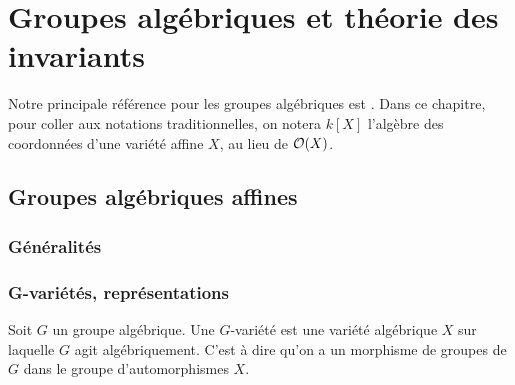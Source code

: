 \chapter{Groupes algébriques et théorie des invariants}

Notre principale référence pour les groupes algébriques est \cite{LAGSpringer}. Dans ce chapitre, pour coller aux notations traditionnelles, on notera $k[X]$ l'algèbre des coordonnées d'une variété affine $X$, au lieu de $\mathcal{O}(X)$.

\section{Groupes algébriques affines}
\subsection{Généralités}
\subsection{G-variétés, représentations}

\begin{defn}[G-variété]
Soit $G$ un groupe algébrique. Une $G$-variété est une variété algébrique $X$ sur laquelle $G$ agit algébriquement. C'est à dire qu'on a un morphisme de groupes de $G$ dans le groupe d'automorphismes $X$.
\end{defn}

